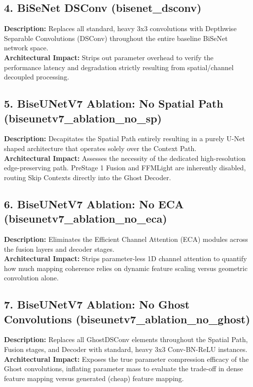 \documentclass{article}
\begin{document}
\subsection{4. BiSeNet DSConv (bisenet\_dsconv)}
\textbf{Description:} Replaces all standard, heavy 3x3 convolutions with Depthwise Separable Convolutions (DSConv) throughout the entire baseline BiSeNet network space.
\\
\textbf{Architectural Impact:} Strips out parameter overhead to verify the performance latency and degradation strictly resulting from spatial/channel decoupled processing.

\subsection{5. BiseUNetV7 Ablation: No Spatial Path (biseunetv7\_ablation\_no\_sp)}
\textbf{Description:} Decapitates the Spatial Path entirely resulting in a purely U-Net shaped architecture that operates solely over the Context Path.
\\
\textbf{Architectural Impact:} Assesses the necessity of the dedicated high-resolution edge-preserving path. PreStage 1 Fusion and FFMLight are inherently disabled, routing Skip Contexts directly into the Ghost Decoder.

\subsection{6. BiseUNetV7 Ablation: No ECA (biseunetv7\_ablation\_no\_eca)}
\textbf{Description:} Eliminates the Efficient Channel Attention (ECA) modules across the fusion layers and decoder stages.
\\
\textbf{Architectural Impact:} Strips parameter-less 1D channel attention to quantify how much mapping coherence relies on dynamic feature scaling versus geometric convolution alone.

\subsection{7. BiseUNetV7 Ablation: No Ghost Convolutions (biseunetv7\_ablation\_no\_ghost)}
\textbf{Description:} Replaces all GhostDSConv elements throughout the Spatial Path, Fusion stages, and Decoder with standard, heavy 3x3 Conv-BN-ReLU instances.
\\
\textbf{Architectural Impact:} Exposes the true parameter compression efficacy of the Ghost convolutions, inflating parameter mass to evaluate the trade-off in dense feature mapping versus generated (cheap) feature mapping.
\end{document}

